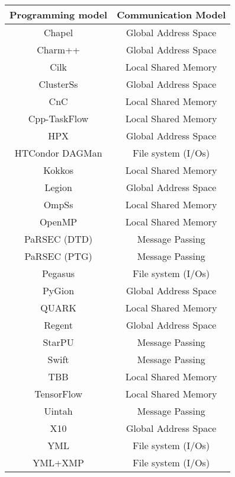 \begin{tabular}{cc}
\hline
Programming model & Communication Model \\
\hline
Chapel & Global Address Space\\
Charm++ & Global Address Space\\
Cilk & Local Shared Memory\\
ClusterSs & Global Address Space\\
CnC & Local Shared Memory\\
Cpp-TaskFlow & Local Shared Memory\\
HPX & Global Address Space\\
HTCondor DAGMan & File system (I/Os)\\
Kokkos & Local Shared Memory\\
Legion & Global Address Space\\
OmpSs & Local Shared Memory\\
OpenMP & Local Shared Memory\\
PaRSEC (DTD) & Message Passing\\
PaRSEC (PTG) & Message Passing\\
Pegasus & File system (I/Os)\\
PyGion & Global Address Space\\
QUARK & Local Shared Memory\\
Regent & Global Address Space\\
StarPU & Message Passing\\
Swift & Message Passing\\
TBB & Local Shared Memory\\
TensorFlow & Local Shared Memory\\
Uintah & Message Passing\\
X10 & Global Address Space\\
YML & File system (I/Os)\\
YML+XMP & File system (I/Os)\\
\hline
\end{tabular}
